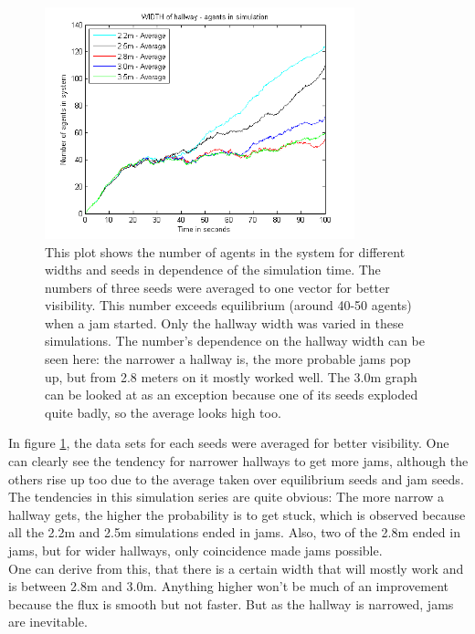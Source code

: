 \begin{figure}[h!]
	\centering
		\includegraphics[width=0.80\textwidth]{../../code/sim/Width/AAveragesInOne.png}
	\caption{This plot shows the number of agents in the system for different widths and seeds in dependence of the simulation time. The numbers of three seeds were averaged to one vector for better visibility. This number exceeds equilibrium (around 40-50 agents) when a jam started. Only the hallway width was varied in these simulations. The number's dependence on the hallway width can be seen here: the narrower a hallway is, the more probable jams pop up, but from 2.8 meters on it mostly worked well. The 3.0m graph can be looked at as an exception because one of its seeds exploded quite badly, so the average looks high too.}
	\label{fig:AveragesInOne}
\end{figure}

In figure \ref{fig:AveragesInOne}, the data sets for each seeds were averaged for better visibility. One can clearly see the tendency for narrower hallways to get more jams, although the others rise up too due to the average taken over equilibrium seeds and jam seeds.\\

The tendencies in this simulation series are quite obvious: The more narrow a hallway gets, the higher the probability is to get stuck, which is observed because all the 2.2m and 2.5m simulations ended in jams. Also, two of the 2.8m ended in jams, but for wider hallways, only coincidence made jams possible.\\
One can derive from this, that there is a certain width that will mostly work and is between 2.8m and 3.0m. Anything higher won't be much of an improvement because the flux is smooth but not faster. But as the hallway is narrowed, jams are inevitable.\\
